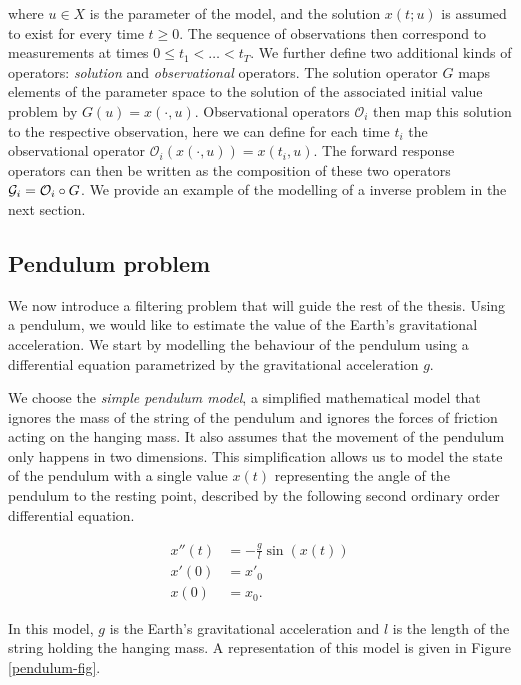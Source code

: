 where $u \in X$ is the parameter of the model, and the solution $x(t; u)$ is assumed to exist for every time $t \geq 0$. The sequence of observations then correspond to measurements at times  $0 \leq t_1 < \ldots < t_T$. We further define two additional kinds of operators: \textit{solution} and \textit{observational} operators. The solution operator $G$ maps elements of the parameter space to the solution of the associated initial value problem by $G(u) = x(\cdot, u)$. Observational operators $\mathcal{O}_i$ then map this solution to the respective observation, here we can define for each time $t_i$ the observational operator $\mathcal{O}_i(x(\cdot, u)) = x(t_i, u)$. The forward response operators can then be written as the composition of these two operators $\mathcal{G}_i = \mathcal{O}_i \circ G$. We provide an example of the modelling of a inverse problem in the next section.

\subsection{Pendulum problem}

We now introduce a filtering problem that will guide the rest of the thesis. Using a pendulum, we would like to estimate the value of the Earth's gravitational acceleration. We start by modelling the behaviour of the pendulum using a differential equation parametrized by the gravitational acceleration $g$.

We choose the \textit{simple pendulum model}, a simplified mathematical model that ignores the mass of the string of the pendulum and ignores the forces of friction acting on the hanging mass. It also assumes that the movement of the pendulum only happens in two dimensions. This simplification allows us to model the state of the pendulum with a single value $x(t)$ representing the angle of the pendulum to the resting point, described by the following second ordinary order differential equation.

\begin{equation}\label{pendulum-ode}
  \begin{aligned}
  x''(t) &= -\frac{g}{l}\sin(x(t))\\
  x'(0) &= x'_0\\
  x(0) &= x_0.
  \end{aligned}
\end{equation}

In this model, $g$ is the Earth's gravitational acceleration and $l$ is the length of the string holding the hanging mass. A representation of this model is given in Figure \ref{pendulum-fig}.

